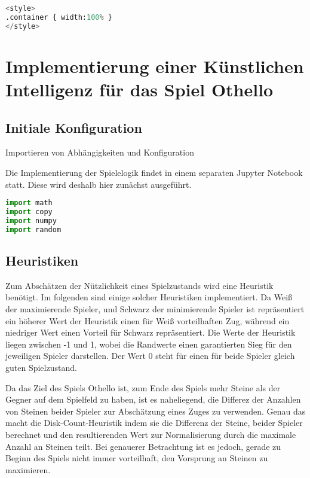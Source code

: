 \begin{lstlisting}[language=Python]
%%HTML
<style>
.container { width:100% }
</style>
\end{lstlisting}

\hypertarget{implementierung-einer-kuxfcnstlichen-intelligenz-fuxfcr-das-spiel-othello}{%
\section{Implementierung einer Künstlichen Intelligenz für das Spiel
Othello}\label{implementierung-einer-kuxfcnstlichen-intelligenz-fuxfcr-das-spiel-othello}}

\hypertarget{initiale-konfiguration}{%
\subsection{Initiale Konfiguration}\label{initiale-konfiguration}}

Importieren von Abhängigkeiten und Konfiguration

Die Implementierung der Spielelogik findet in einem separaten Jupyter
Notebook statt. Diese wird deshalb hier zunächst ausgeführt.

\begin{lstlisting}[language=Python]
import math
import copy
import numpy
import random
\end{lstlisting}

\hypertarget{heuristiken}{%
\subsection{Heuristiken}\label{heuristiken}}

Zum Abschätzen der Nützlichkeit eines Spielzustands wird eine Heuristik
benötigt. Im folgenden sind einige solcher Heuristiken implementiert. Da
Weiß der maximierende Spieler, und Schwarz der minimierende Spieler ist
repräsentiert ein höherer Wert der Heuristik einen für Weiß
vorteilhaften Zug, während ein niedriger Wert einen Vorteil für Schwarz
repräsentiert. Die Werte der Heuristik liegen zwischen -1 und 1, wobei
die Randwerte einen garantierten Sieg für den jeweiligen Spieler
darstellen. Der Wert 0 steht für einen für beide Spieler gleich guten
Spielzustand.

Da das Ziel des Spiels Othello ist, zum Ende des Spiels mehr Steine als
der Gegner auf dem Spielfeld zu haben, ist es naheliegend, die Differez
der Anzahlen von Steinen beider Spieler zur Abschätzung eines Zuges zu
verwenden. Genau das macht die Disk-Count-Heuristik indem sie die
Differenz der Steine, beider Spieler berechnet und den resultierenden
Wert zur Normalisierung durch die maximale Anzahl an Steinen teilt. Bei
genauerer Betrachtung ist es jedoch, gerade zu Beginn des Spiels nicht
immer vorteilhaft, den Vorsprung an Steinen zu maximieren.

